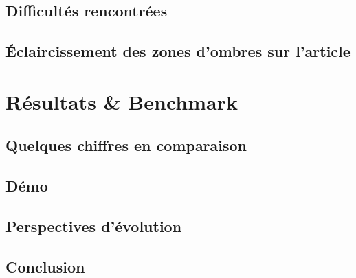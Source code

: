 \begin{frame}[fragile=singleslide]{\insertsectionhead}
  \framesubtitle{\insertsubsectionhead}
\end{frame}

\subsection{Difficultés rencontrées}

\begin{frame}[fragile=singleslide]{\insertsectionhead}
  \framesubtitle{\insertsubsectionhead}
\end{frame}

\subsection{Éclaircissement des zones d'ombres sur l'article}

\begin{frame}[fragile=singleslide]{\insertsectionhead}
  \framesubtitle{\insertsubsectionhead}
\end{frame}

\section{Résultats \& Benchmark}

\subsection{Quelques chiffres en comparaison}

\begin{frame}[fragile=singleslide]{\insertsectionhead}
  \framesubtitle{\insertsubsectionhead}
\end{frame}

\subsection{Démo}

\begin{frame}[fragile=singleslide]{\insertsectionhead}
  \framesubtitle{\insertsubsectionhead}
\end{frame}

\subsection{Perspectives d'évolution}

\begin{frame}[fragile=singleslide]{\insertsectionhead}
  \framesubtitle{\insertsubsectionhead}
\end{frame}

\subsection{Conclusion}

\begin{frame}[fragile=singleslide]{\insertsectionhead}
  \framesubtitle{\insertsubsectionhead}
\end{frame}

